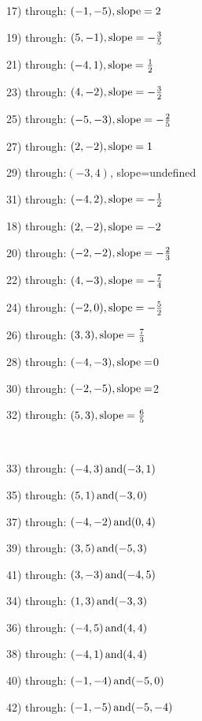\begin{multicols}{2}
  17) through: $(- 1, - 5), \operatorname{slope} = 2$
  
  19) through: $(5, - 1), \operatorname{slope} = - \frac{3}{5}$
  
  21) through: $(- 4, 1), \operatorname{slope} = \frac{1}{2}$
  
  23) through: $(4, - 2), \operatorname{slope} = - \frac{3}{2}$
  
  25) through: $(- 5, - 3), \operatorname{slope} = - \frac{2}{5}$
  
  27) through: $(2, - 2), \operatorname{slope} = 1$
  
  29) through:$(- 3, 4)$, slope=undefined
  
  31) through: $(- 4, 2), \operatorname{slope} = - \frac{1}{2}$
  
  18) through: $(2, - 2), \operatorname{slope} = - 2$
  
  20) through: $(- 2, - 2), \operatorname{slope} = - \frac{2}{3}$
  
  22) through: $(4, - 3), \operatorname{slope} = - \frac{7}{4}$
  
  24) through: $(- 2, 0), \operatorname{slope} = - \frac{5}{2}$
  
  26) through: $(3, 3), \operatorname{slope} = \frac{7}{3}$
  
  28) through: $(- 4, - 3), \operatorname{slope} =$0
  
  30) through: $(- 2, - 5), \operatorname{slope} =$2
  
  32) through: $(5, 3), \operatorname{slope} = \frac{6}{5}$
\end{multicols}

\

{\pagebreak}

{}

\begin{multicols}{2}
  33) through: $(- 4, 3) \operatorname{and} (- 3, 1)$
  
  35) through: $(5, 1) \operatorname{and} (- 3, 0)$
  
  37) through: $(- 4, - 2) \operatorname{and} (0, 4)$
  
  39) through: $(3, 5) \operatorname{and} (- 5, 3)$
  
  41) through: $(3, - 3) \operatorname{and} (- 4, 5)$
  
  34) through: $(1, 3) \operatorname{and} (- 3, 3)$
  
  36) through: $(- 4, 5) \operatorname{and} (4, 4)$
  
  38) through: $(- 4, 1) \operatorname{and} (4, 4)$
  
  40) through: $(- 1, - 4) \operatorname{and} (- 5, 0)$
  
  42) through: $(- 1, - 5) \operatorname{and} (- 5, - 4)$
\end{multicols}

